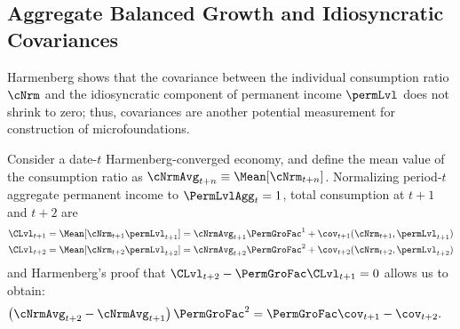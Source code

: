 \documentclass[\econtexRoot/BufferStockTheory]{subfiles}
\begin{document}
\hypertarget{Balanced-Growth-Of-Covariances}{}
\subsection{Aggregate Balanced Growth and Idiosyncratic Covariances}\label{subsec:Covariances}

Harmenberg shows that the covariance between the individual consumption ratio $\cNrm$ and the idiosyncratic component of permanent income $\permLvl$ does not shrink to zero; thus, covariances are another potential measurement for construction of microfoundations.

Consider a date-$t$ Harmenberg-converged economy, and define the mean value of the consumption ratio as $\cNrmAvg_{t+n} \equiv \Mean[\cNrm_{t+n}]$.
Normalizing period-$t$ aggregate permanent income to $\PermLvlAgg_{t}=1$, total consumption at $t+1$ and $t+2$ are
\begin{equation}\label{eq:atp2vsatp1}
  \begin{aligned}
    \CLvl_{t+1} & = \Mean[\cNrm_{t+1}\permLvl_{t+1}] = \cNrmAvg_{t+1}\PermGroFac^{1} + \cov_{t+1}(\cNrm_{t+1}, \permLvl_{t+1})
    \\  \CLvl_{t+2} & = \Mean[\cNrm_{t+2}\permLvl_{t+2}] = \cNrmAvg_{t+2}\PermGroFac^{2} + \cov_{t+2}(\cNrm_{t+2}, \permLvl_{t+2})
  \end{aligned}
\end{equation}
and Harmenberg's proof that $\CLvl_{t+2}-\PermGroFac \CLvl_{t+1}=0$ allows us to obtain:
\begin{equation} \label{eq:cNrmvsCov}\begin{aligned}
    \left(\cNrmAvg_{t+2} - \cNrmAvg_{t+1}\right)\PermGroFac^{2} & = \PermGroFac \cov_{t+1} - \cov_{t+2} .
  \end{aligned}\end{equation}
\end{document}
